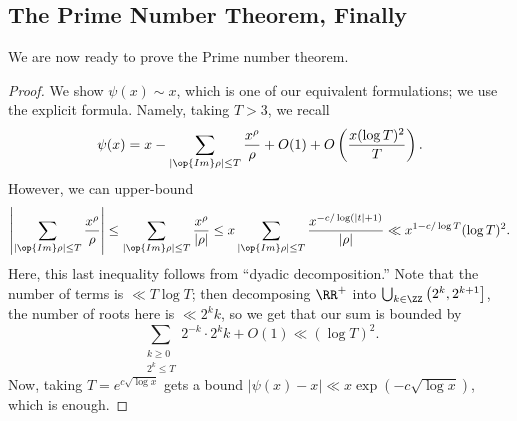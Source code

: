 \documentclass[../notes.tex]{subfiles}
\begin{document}
\subsection{The Prime Number Theorem, Finally}
We are now ready to prove the Prime number theorem.
\pntthm*
\begin{proof}
	We show $\psi(x)\sim x$, which is one of our equivalent formulations; we use the explicit formula. Namely, taking $T>3$, we recall
	\[\psi(x)=x-\sum_{|\op{Im}\rho|\le T}\frac{x^\rho}\rho+O(1)+O\left(\frac{x(\log T)^2}T\right).\]
	However, we can upper-bound
	\[\left|\sum_{|\op{Im}\rho|\le T}\frac{x^\rho}\rho\right|\le\sum_{|\op{Im}\rho|\le T}\frac{x^\rho}{|\rho|}\le x\sum_{|\op{Im}\rho|\le T}\frac{x^{-c/\log(|t|+1)}}{|\rho|}\ll x^{1-c/\log T}(\log T)^2.\]
	Here, this last inequality follows from ``dyadic decomposition.'' Note that the number of terms is $\ll T\log T$; then decomposing $\RR^+$ into $\bigcup_{k\in\ZZ}\left(2^k,2^{k+1}\right]$, the number of roots here is $\ll 2^kk$, so we get that our sum is bounded by
	\[\sum_{\substack{k\ge0\\2^k\le T}}2^{-k}\cdot 2^kk+O(1)\ll(\log T)^2.\]
	Now, taking $T=e^{c\sqrt{\log x}}$ gets a bound $|\psi(x)-x|\ll x\exp(-c\sqrt{\log x})$, which is enough.
\end{proof}
\end{document}
